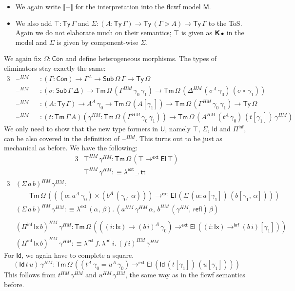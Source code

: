 \documentclass[12pt,a4paper,twoside,openany]{book}
\theoremstyle{remark}
\theoremstyle{definition}
\theoremstyle{theorem}
\newcommand{\ms}[1]{\mathsf{#1}}
\newcommand{\bs}[1]{\boldsymbol{#1}}
\newcommand{\refl}{\mathsf{refl}}
\newcommand{\Con}{\mathsf{Con}}
\newcommand{\Sub}{\mathsf{Sub}}
\newcommand{\Tm}{\mathsf{Tm}}
\newcommand{\Ty}{\mathsf{Ty}}
\newcommand{\U}{\mathsf{U}}
\newcommand{\El}{\mathsf{El}}
\newcommand{\Id}{\mathsf{Id}}
\renewcommand{\tt}{\mathsf{tt}}
\newcommand{\blank}{\mathord{\hspace{1pt}\text{--}\hspace{1pt}}}
\newcommand{\ext}{\triangleright}
\newcommand{\toe}{\to^{\ms{ext}}}
\newcommand{\Piinf}{\Pi^{\mathsf{inf}}}
\newcommand{\toinf}{\to^{\ms{inf}}}
\newcommand{\lambdainf}{\lambda^{\ms{inf}}}
\newcommand{\lambdae}{\lambda^{\ms{ext}}}
\newcommand{\bemptycon}{\scaleobj{.75}{\bs{\bullet}}}
\newcommand{\bM}{\bs{\mathsf{M}}}
\newcommand{\llb}{\llbracket}
\newcommand{\rrb}{\rrbracket}
\newcommand{\defn}{:\equiv}
\begin{document}
\begin{itemize}
  \item
  We again write $\llb\blank\rrb$ for the interpretation into the flcwf model $\bM$.
  \item
  We also add $\top : \Ty\,\Gamma$ and $\Sigma : (A : \Ty\,\Gamma) \to
  \Ty\,(\Gamma \ext A) \to \Ty\,\Gamma$ to the ToS. Again we do not elaborate
  much on their semantics; $\top$ is given as ${\bs{\ms{K}}\,\bemptycon}$ in
  the model and $\Sigma$ is given by component-wise $\Sigma$.
\end{itemize}
We again fix $\Omega : \Con$ and define heterogeneous morphisms. The types of
eliminators stay exactly the same:
\begin{alignat*}{3}
  &\blank^{HM} &&: (\Gamma : \Con) \to \Gamma^A \to \Sub\,\Omega\,\Gamma \to \Ty\,\Omega\\
  &\blank^{HM} &&: (\sigma : \Sub\,\Gamma\,\Delta) \to \Tm\,\Omega\,(\Gamma^{HM}\,\gamma_0\,\gamma_1) \to \Tm\,\Omega\,(\Delta^{HM}\,(\sigma^A\,\gamma_0)\,(\sigma \circ\,\gamma_1))\\
  &\blank^{HM} &&: (A : \Ty\,\Gamma) \to A^A\,\gamma_0 \to \Tm\,\Omega\,(A[\gamma_1])
  \to \Tm\,\Omega\,(\Gamma^{HM}\,\gamma_0\,\gamma_1) \to \Ty\,\Omega\\
  &\blank^{HM} &&: (t : \Tm\,\Gamma\,A)(\gamma^{HM} : \Tm\,\Omega\,(\Gamma^{HM}\,\gamma_0\,\gamma_1))
   \to \Tm\,\Omega\,(A^{HM}\,(t^A\,\gamma_0)\,(t[\gamma_1])\,\gamma^{HM})
\end{alignat*}
We only need to show that the new type formers in $\U$, namely $\top$, $\Sigma$,
$\Id$ and $\Piinf$, can be also covered in the definition of $\blank^{HM}$. This
turns out to be just as mechanical as before. We have the following:
\begin{alignat*}{3}
  & \top^{HM}\,\gamma^{HM} : \Tm\,\Omega\,(\top \toe \El\,\top)\\
  & \top^{HM}\,\gamma^{HM} \defn \lambdae\,\_.\,\tt
\end{alignat*}
\begin{alignat*}{3}
  & (\Sigma\,a\,b)^{HM}\,\gamma^{HM} : \\
  & \hspace{2em} \Tm\,\Omega\,(((\alpha : a^A\,\gamma_0) \times (b^A\,(\gamma_0,\,\alpha))) \toe \El\,(\Sigma\,(\alpha : a[\gamma_1])\,(b[\gamma_1,\,\alpha])))\\
  & (\Sigma\,a\,b)^{HM}\,\gamma^{HM} \defn \lambdae\,(\alpha,\,\beta).\,(a^{HM}\,\gamma^{HM}\,\alpha,\,b^{HM}\,(\gamma^{HM},\,\refl)\,\beta)\\
  & \\
  & (\Piinf\,\ms{Ix}\,b)^{HM}\,\gamma^{HM} : \Tm\,\Omega\,(((i : \ms{Ix}) \to (b\,i)^A\,\gamma_0) \toe \El\,((i : \ms{Ix}) \toinf (b\,i)[\gamma_1]))\\
  & (\Piinf\,\ms{Ix}\,b)^{HM}\,\gamma^{HM} \defn \lambdae\,f.\,\lambdainf\,i.\,(f\,i)^{HM}\,\gamma^{HM}
\end{alignat*}
For $\Id$, we again have to complete a square.
\[
(\Id\,t\,u)\,\gamma^{HM} : \Tm\,\Omega\,((t^A\,\gamma_0 = u^A\,\gamma_0) \toe \El\,(\Id\,(t[\gamma_1])\,(u[\gamma_1])))
\]
This follows from $t^{HM}\,\gamma^{HM}$ and $u^{HM}\,\gamma^{HM}$, the same way
as in the flcwf semantics before.
\end{document}
